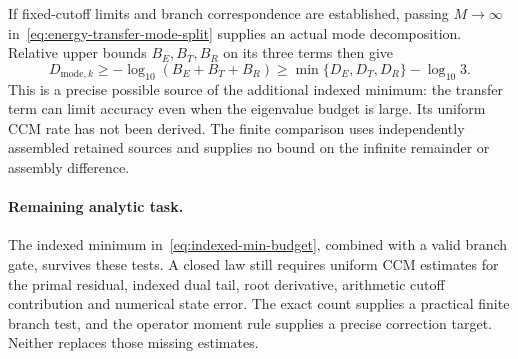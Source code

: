 If fixed-cutoff limits and branch correspondence are established, passing
$M\to\infty$ in~\eqref{eq:energy-transfer-mode-split} supplies an actual
mode decomposition. Relative upper bounds $B_E,B_T,B_R$ on its three
terms then give
\[
 D_{\mathrm{mode},k}\ge
 -\log_{10}(B_E+B_T+B_R)
 \ge\min\{D_E,D_T,D_R\}-\log_{10}3.
\]
This is a precise possible source of the additional indexed minimum:
the transfer term can limit accuracy even when the eigenvalue budget is
large. Its uniform CCM rate has not been derived. The finite comparison
uses independently assembled retained sources and supplies no bound on
the infinite remainder or assembly difference.

\paragraph{Remaining analytic task.}
The indexed minimum in~\eqref{eq:indexed-min-budget}, combined with a
valid branch gate, survives these tests. A closed law still requires
uniform CCM estimates for the primal residual, indexed dual tail,
root derivative, arithmetic cutoff contribution and numerical state
error. The exact count supplies a practical finite branch test, and the
operator moment rule supplies a precise correction target. Neither
replaces those missing estimates.
